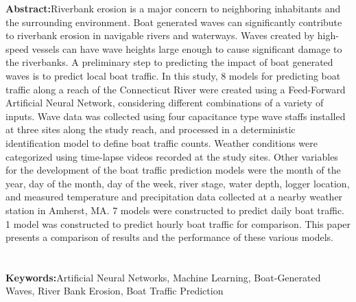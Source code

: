\documentclass[
10pt, %
letterpaper, %
twoside, %
headinclude,footinclude, %
BCOR5mm, %
]{scrartcl}
\begin{document}
\begin{singlespace}
\begin{center}
	\vspace{0.75cm}
	\end{center}
%	
%	
%	

\thispagestyle{empty} %

\textbf{Abstract:}Riverbank erosion is a major concern to neighboring inhabitants and the surrounding environment. Boat generated waves can significantly contribute to riverbank erosion in navigable rivers and waterways. Waves created by high-speed vessels can have wave heights large enough to cause significant damage to the riverbanks. A preliminary step to predicting the impact of boat generated waves is to predict local boat traffic. In this study, 8 models for predicting boat traffic along a reach of the Connecticut River were created using a Feed-Forward Artificial Neural Network, considering different combinations of a variety of inputs. Wave data was collected using four capacitance type wave staffs installed at three sites along the study reach, and processed in a deterministic identification model to define boat traffic counts. Weather conditions were categorized using time-lapse videos recorded at the study sites. Other variables for the development of the boat traffic prediction models were the month of the year, day of the month, day of the week, river stage, water depth, logger location, and measured temperature and precipitation data collected at a nearby weather station in Amherst, MA. 7 models were constructed to predict daily boat traffic. 1 model was constructed to predict hourly boat traffic for comparison. This paper presents a comparison of results and the performance of these various models.
\\
\\
\\
\textbf{Keywords:}Artificial Neural Networks, Machine Learning, Boat-Generated Waves, River Bank Erosion, Boat Traffic Prediction

\end{singlespace}
\end{document}
